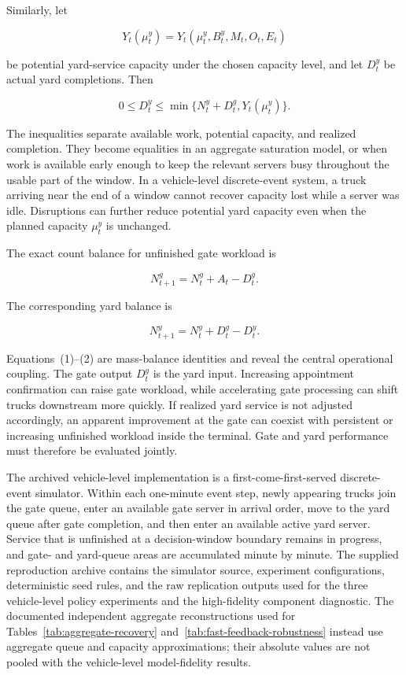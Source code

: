 \documentclass[preprint,12pt,authoryear,a4paper]{elsarticle}
\begin{document}
Similarly, let

\[
Y_t(\mu_t^y)=Y_t(\mu_t^y,B_t^y,M_t,O_t,E_t)
\]

be potential yard-service capacity under the chosen capacity level, and let \(D_t^y\) be actual yard completions. Then

\[
0\le D_t^y\le\min\{N_t^y+D_t^g,Y_t(\mu_t^y)\}.
\]

The inequalities separate available work, potential capacity, and realized completion. They become equalities in an aggregate saturation model, or when work is available early enough to keep the relevant servers busy throughout the usable part of the window. In a vehicle-level discrete-event system, a truck arriving near the end of a window cannot recover capacity lost while a server was idle. Disruptions can further reduce potential yard capacity even when the planned capacity \(\mu_t^y\) is unchanged.

The exact count balance for unfinished gate workload is

\[
N_{t+1}^g
=N_t^g+A_t-D_t^g.
\tag{1}
\]

The corresponding yard balance is

\[
N_{t+1}^y
=N_t^y+D_t^g-D_t^y.
\tag{2}
\]

Equations~(1)--(2) are mass-balance identities and reveal the central operational coupling. The gate output \(D_t^g\) is the yard input. Increasing appointment confirmation can raise gate workload, while accelerating gate processing can shift trucks downstream more quickly. If realized yard service is not adjusted accordingly, an apparent improvement at the gate can coexist with persistent or increasing unfinished workload inside the terminal. Gate and yard performance must therefore be evaluated jointly.

The archived vehicle-level implementation is a first-come-first-served discrete-event simulator. Within each one-minute event step, newly appearing trucks join the gate queue, enter an available gate server in arrival order, move to the yard queue after gate completion, and then enter an available active yard server. Service that is unfinished at a decision-window boundary remains in progress, and gate- and yard-queue areas are accumulated minute by minute. The supplied reproduction archive contains the simulator source, experiment configurations, deterministic seed rules, and the raw replication outputs used for the three vehicle-level policy experiments and the high-fidelity component diagnostic. The documented independent aggregate reconstructions used for Tables~\ref{tab:aggregate-recovery} and~\ref{tab:fast-feedback-robustness} instead use aggregate queue and capacity approximations; their absolute values are not pooled with the vehicle-level model-fidelity results.
\end{document}
